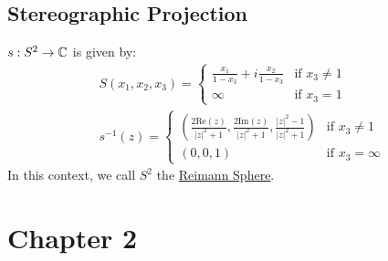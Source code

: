 \documentclass[10pt]{paper}
\newcommand{\cpr}[1]{\left(#1\right)}
\renewcommand{\Re}[1]{\text{Re}\left(#1\right)}
\renewcommand{\Im}[1]{\text{Im}\left(#1\right)}
\newcommand{\ul}[1]{\underline{#1}}
\begin{document}
\subsection{Stereographic Projection}
$s:S^2\to\mathbb{C}$ is given by:
\begin{align*}
  &S(x_1,x_2,x_3)=\begin{cases}
    \frac{x_1}{1-x_3}+i\frac{x_2}{1-x_3}&\text{if }x_3\ne 1\\
    \infty &\text{if }x_3 = 1
  \end{cases}\\
  &s^{-1}(z)=\begin{cases}
    \cpr{\frac{2\Re{z}}{|z|^2+1}, \frac{2\Im{z}}{|z|^2+1}, \frac{|z|^2-1}{|z|^2+1}}&\text{if }x_3\ne 1\\
    (0,0,1)&\text{if }x_3 = \infty
  \end{cases}
\end{align*}
In this context, we call $S^2$ the \ul{Reimann Sphere}.
\section*{Chapter 2}
\end{document}
